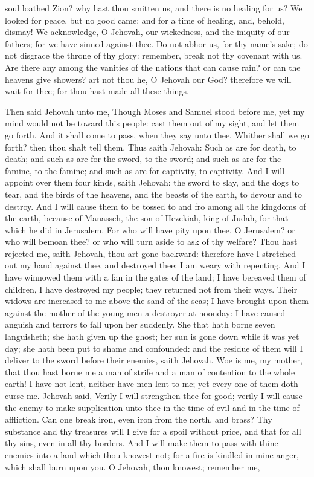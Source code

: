 soul loathed Zion? why hast thou smitten us, and there is no healing for us? We looked for peace, but no good came; and for a time of healing, and, behold, dismay! We acknowledge, O Jehovah, our wickedness, and the iniquity of our fathers; for we have sinned against thee. Do not abhor us, for thy name’s sake; do not disgrace the throne of thy glory: remember, break not thy covenant with us. Are there any among the vanities of the nations that can cause rain? or can the heavens give showers? art not thou he, O Jehovah our God? therefore we will wait for thee; for thou hast made all these things. 

Then said Jehovah unto me, Though Moses and Samuel stood before me, yet my mind would not be toward this people: cast them out of my sight, and let them go forth. And it shall come to pass, when they say unto thee, Whither shall we go forth? then thou shalt tell them, Thus saith Jehovah: Such as are for death, to death; and such as are for the sword, to the sword; and such as are for the famine, to the famine; and such as are for captivity, to captivity. And I will appoint over them four kinds, saith Jehovah: the sword to slay, and the dogs to tear, and the birds of the heavens, and the beasts of the earth, to devour and to destroy. And I will cause them to be tossed to and fro among all the kingdoms of the earth, because of Manasseh, the son of Hezekiah, king of Judah, for that which he did in Jerusalem.  For who will have pity upon thee, O Jerusalem? or who will bemoan thee? or who will turn aside to ask of thy welfare? Thou hast rejected me, saith Jehovah, thou art gone backward: therefore have I stretched out my hand against thee, and destroyed thee; I am weary with repenting. And I have winnowed them with a fan in the gates of the land; I have bereaved them of children, I have destroyed my people; they returned not from their ways. Their widows are increased to me above the sand of the seas; I have brought upon them against the mother of the young men a destroyer at noonday: I have caused anguish and terrors to fall upon her suddenly. She that hath borne seven languisheth; she hath given up the ghost; her sun is gone down while it was yet day; she hath been put to shame and confounded: and the residue of them will I deliver to the sword before their enemies, saith Jehovah.  Woe is me, my mother, that thou hast borne me a man of strife and a man of contention to the whole earth! I have not lent, neither have men lent to me; yet every one of them doth curse me.  Jehovah said, Verily I will strengthen thee for good; verily I will cause the enemy to make supplication unto thee in the time of evil and in the time of affliction. Can one break iron, even iron from the north, and brass? Thy substance and thy treasures will I give for a spoil without price, and that for all thy sins, even in all thy borders. And I will make them to pass with thine enemies into a land which thou knowest not; for a fire is kindled in mine anger, which shall burn upon you.  O Jehovah, thou knowest; remember me, 